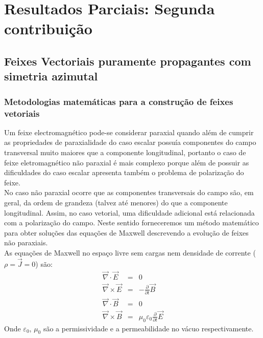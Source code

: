 \chapter{Resultados Parciais: Segunda contribui\c{c}\~ao}
\section{Feixes Vectoriais puramente propagantes com simetria azimutal}
\subsection{Metodologias matem\'aticas para a constru\c{c}\~ao de feixes vetoriais}
Um feixe electromagn\'etico pode-se considerar paraxial quando al\'em de cumprir as propriedades de paraxialidade do caso escalar possu\'ia componentes do campo transversal muito maiores que a componente longitudinal, portanto o caso de feixe eletromagn\'etico n\~ao paraxial \'e mais complexo porque al\'em de possuir as dificuldades do caso escalar apresenta tamb\'em o problema de polariza\c{c}\~ao do feixe.\\
No caso n\~ao paraxial ocorre que as componentes transversais do campo s\~ao, em geral, da ordem de grandeza (talvez at\'e menores) do que a componente longitudinal. Assim, no caso vetorial, uma dificuldade adicional est\'a relacionada com a polariza\c{c}\~ao do campo. Neste sentido forneceremos um m\'etodo matem\'atico para obter solu\c{c}\~oes das equa\c{c}\~oes de Maxwell descrevendo a evolu\c{c}\~ao de feixes n\~ao paraxiais.\\
As equa\c{c}\~oes de Maxwell no espa\c{c}o livre sem cargas nem densidade de corrente ($\rho=\vec{J}=0$) s\~ao: 
\begin{eqnarray}
\vec{\nabla}\cdot\vec{E}&=&0 \label{eq001}\\
\vec{\nabla}\times\vec{E}&=&-\frac{\partial}{\partial t}\vec{B}\label{eq002}\\
\vec{\nabla}\cdot\vec{B}&=&0\label{eq003}\\
\vec{\nabla}\times\vec{B}&=&\mu_0\varepsilon_0\frac{\partial}{\partial t}\vec{E}\label{eq004}
\end{eqnarray}
Onde $\varepsilon_0$, $\mu_0$ s\~ao a permissividade e a permeabilidade  no v\'acuo respectivamente.\\
